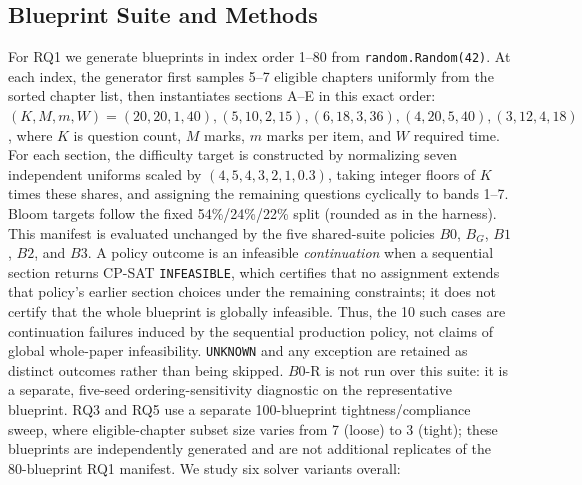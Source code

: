 \documentclass[runningheads]{llncs}
\begin{document}
\subsection{Blueprint Suite and Methods}
\label{sec:methods}
For RQ1 we generate blueprints in index order 1--80 from \texttt{random.Random(42)}.
At each index, the generator first samples 5--7 eligible chapters uniformly from the sorted chapter list, then instantiates sections A--E in this exact order: $(K,M,m,W)=(20,20,1,40),(5,10,2,15),(6,18,3,36),(4,20,5,40),(3,12,4,18)$, where $K$ is question count, $M$ marks, $m$ marks per item, and $W$ required time.
For each section, the difficulty target is constructed by normalizing seven independent uniforms scaled by $(4,5,4,3,2,1,0.3)$, taking integer floors of $K$ times these shares, and assigning the remaining questions cyclically to bands 1--7.
Bloom targets follow the fixed 54\%/24\%/22\% split (rounded as in the harness).
This manifest is evaluated unchanged by the five shared-suite policies $B0$, $B_G$, $B1$, $B2$, and $B3$.
A policy outcome is an infeasible \emph{continuation} when a sequential section returns CP-SAT \texttt{INFEASIBLE}, which certifies that no assignment extends that policy's earlier section choices under the remaining constraints;
it does not certify that the whole blueprint is globally infeasible.
Thus, the 10 such cases are continuation failures induced by the sequential production policy, not claims of global whole-paper infeasibility.
\texttt{UNKNOWN} and any exception are retained as distinct outcomes rather than being skipped.
$B0$-R is not run over this suite: it is a separate, five-seed ordering-sensitivity diagnostic on the representative blueprint.
RQ3 and RQ5 use a separate 100-blueprint tightness/compliance sweep, where eligible-chapter subset size varies from 7 (loose) to 3 (tight); these blueprints are independently generated and are not additional replicates of the 80-blueprint RQ1 manifest.
We study six solver variants overall:
\end{document}
